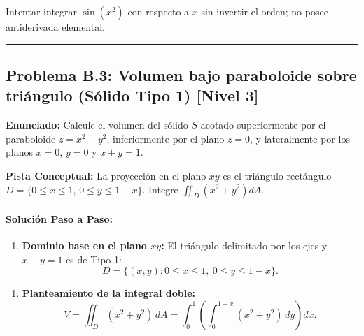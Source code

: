 \documentclass[11pt,a4paper]{article}
\begin{document}
\begin{trapbox}
Intentar integrar $\sin(x^2)$ con respecto a $x$ sin invertir el orden; no posee antiderivada elemental.
\end{trapbox}

\vspace{0.5cm}
\hrule
\vspace{0.5cm}

\subsection*{Problema B.3: Volumen bajo paraboloide sobre triángulo (Sólido Tipo 1) \hfill \color{primaryblue}\small[Nivel 3]}

\begin{tcolorbox}[colback=white,colframe=gray!40,arc=1mm,boxrule=0.5pt,left=3mm,right=3mm,top=2mm,bottom=2mm]
\textbf{Enunciado:} Calcule el volumen del sólido $S$ acotado superiormente por el paraboloide $z = x^2 + y^2$, inferiormente por el plano $z = 0$, y lateralmente por los planos $x = 0$, $y = 0$ y $x + y = 1$.
\end{tcolorbox}

\begin{tcolorbox}[colback=yellow!4,colframe=accentamber!70,arc=1mm,boxrule=0.5pt,left=3mm,right=3mm,top=1.5mm,bottom=1.5mm]
\textbf{Pista Conceptual:} La proyección en el plano $xy$ es el triángulo rectángulo $D = \{0 \le x \le 1, \, 0 \le y \le 1-x\}$. Integre $\iint_D (x^2+y^2) dA$.
\end{tcolorbox}

\paragraph{Solución Paso a Paso:}\par
\begin{enumerate}[label=\textbf{\arabic*.}]
\item \textbf{Dominio base en el plano $xy$:}
El triángulo delimitado por los ejes y $x+y=1$ es de Tipo 1:
\begin{equation*}
D = \{(x,y) : 0 \le x \le 1, \ 0 \le y \le 1 - x\}.
\end{equation*}
\end{enumerate}

\begin{enumerate}[label=\textbf{\arabic*.}]
\item \textbf{Planteamiento de la integral doble:}
\begin{equation*}
V = \iint_D (x^2 + y^2) \, dA = \int_0^1 \left( \int_0^{1-x} (x^2 + y^2) \, dy \right) dx.
\end{equation*}
\end{enumerate}
\end{document}
